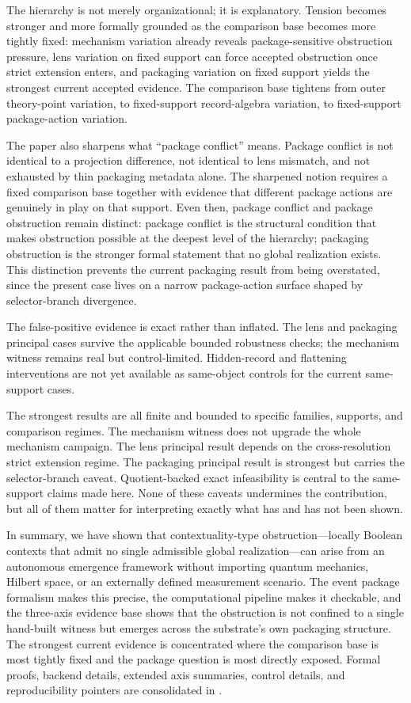 \documentclass[11pt]{article}
\theoremstyle{definition}
\begin{document}
The hierarchy is not merely organizational; it is explanatory. Tension becomes stronger and more formally grounded as the comparison base becomes more tightly fixed: mechanism variation already reveals package-sensitive obstruction pressure, lens variation on fixed support can force accepted obstruction once strict extension enters, and packaging variation on fixed support yields the strongest current accepted evidence. The comparison base tightens from outer theory-point variation, to fixed-support record-algebra variation, to fixed-support package-action variation.

The paper also sharpens what ``package conflict'' means. Package conflict is not identical to a projection difference, not identical to lens mismatch, and not exhausted by thin packaging metadata alone. The sharpened notion requires a fixed comparison base together with evidence that different package actions are genuinely in play on that support. Even then, package conflict and package obstruction remain distinct: package conflict is the structural condition that makes obstruction possible at the deepest level of the hierarchy; packaging obstruction is the stronger formal statement that no global realization exists. This distinction prevents the current packaging result from being overstated, since the present case lives on a narrow package-action surface shaped by selector-branch divergence.

The false-positive evidence is exact rather than inflated. The lens and packaging principal cases survive the applicable bounded robustness checks; the mechanism witness remains real but control-limited. Hidden-record and flattening interventions are not yet available as same-object controls for the current same-support cases.

The strongest results are all finite and bounded to specific families, supports, and comparison regimes. The mechanism witness does not upgrade the whole mechanism campaign. The lens principal result depends on the cross-resolution strict extension regime. The packaging principal result is strongest but carries the selector-branch caveat. Quotient-backed exact infeasibility is central to the same-support claims made here. None of these caveats undermines the contribution, but all of them matter for interpreting exactly what has and has not been shown.

In summary, we have shown that contextuality-type obstruction---locally Boolean contexts that admit no single admissible global realization---can arise from an autonomous emergence framework without importing quantum mechanics, Hilbert space, or an externally defined measurement scenario. The event package formalism makes this precise, the computational pipeline makes it checkable, and the three-axis evidence base shows that the obstruction is not confined to a single hand-built witness but emerges across the substrate's own packaging structure. The strongest current evidence is concentrated where the comparison base is most tightly fixed and the package question is most directly exposed. Formal proofs, backend details, extended axis summaries, control details, and reproducibility pointers are consolidated in .
\end{document}
